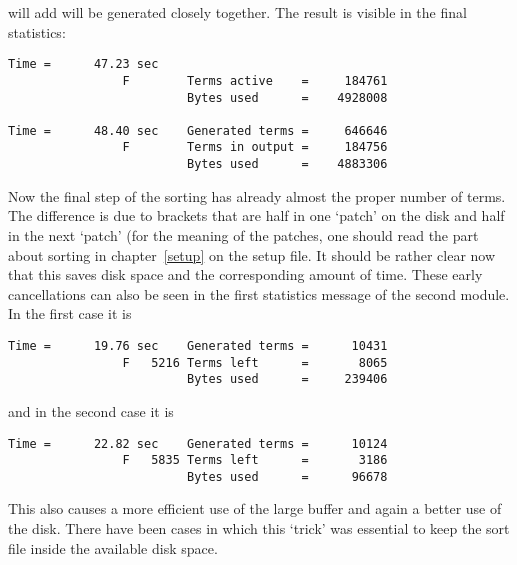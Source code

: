 will add will be generated closely together.
The result is visible in the final statistics:
\begin{verbatim}
Time =      47.23 sec
                F        Terms active    =     184761
                         Bytes used      =    4928008

Time =      48.40 sec    Generated terms =     646646
                F        Terms in output =     184756
                         Bytes used      =    4883306
\end{verbatim}
Now the final step of the sorting has already almost the proper number of 
terms. The difference is due to brackets that are half in one `patch' on 
the disk and half in the next `patch' (for the meaning of the patches, one 
should read the part about sorting in chapter~\ref{setup} on 
the setup file. It should be rather clear now that this saves disk space 
and the corresponding amount of time. These early cancellations can also be 
seen in the first statistics message of the second module. In the first 
case it is
\begin{verbatim}
Time =      19.76 sec    Generated terms =      10431
                F   5216 Terms left      =       8065
                         Bytes used      =     239406
\end{verbatim}
and in the second case it is
\begin{verbatim}
Time =      22.82 sec    Generated terms =      10124
                F   5835 Terms left      =       3186
                         Bytes used      =      96678
\end{verbatim}
This also causes a more efficient use of the large buffer and again a 
better use of the disk. There have been cases in which this `trick' was 
essential to keep the sort file inside the available disk space.
